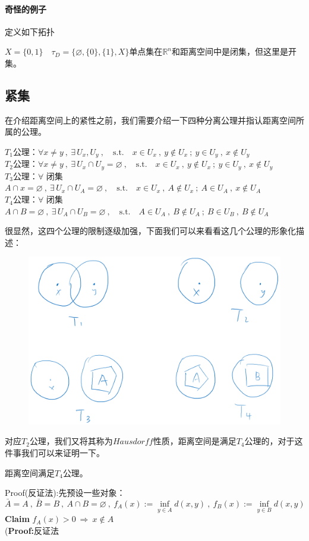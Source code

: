 \paragraph*{奇怪的例子} 定义如下拓扑

$X=\{0,1\} \quad \tau_D=\{\varnothing,\{0\},\{1\},X\}$单点集在$\mathbb{R}^n$和距离空间中是闭集，但这里是开集。

\subsection{紧集}
在介绍距离空间上的紧性之前，我们需要介绍一下四种分离公理并指认距离空间所属的公理。
\begin{proposition}[分离公理]
    $T_1$公理：$\forall x \neq y \ , \ \exists \, U_x,U_y \ , \quad \text{s.t.} \quad x \in U_x \ , \ y \notin U_x \ ; \ y \in U_y \ , \ x \notin U_y$\\
    $T_2$公理：$\forall x \neq y \ , \ \exists \, U_x \cap U_y=\varnothing \ , \quad \text{s.t.} \quad x \in U_x \ , \ y \notin U_x \ ; \ y \in U_y \ , \ x \notin U_y$\\
    $T_3$公理：$\forall$ 闭集$A \cap x=\varnothing \ , \ \exists \, U_x \cap U_A=\varnothing \ , \quad \text{s.t.} \quad x \in U_x \ , \ A \notin U_x \ ; \ A \in U_A \ , \ x \notin U_A$\\
    $T_4$公理：$\forall$ 闭集$A \cap B=\varnothing \ , \ \exists \, U_A \cap U_B=\varnothing \ , \quad \text{s.t.} \quad A \in U_A \ , \ B \notin U_A \ ; \ B \in U_B \ , \ B \notin U_A$
\end{proposition}
很显然，这四个公理的限制逐级加强，下面我们可以来看看这几个公理的形象化描述：
\begin{figure}[htbp]
    \center
    \includegraphics[scale=0.4]{./fig/2.2.2.png}
\end{figure}
对应$T_2$公理，我们又将其称为$Hausdorff$性质，距离空间是满足$T_4$公理的，对于这件事我们可以来证明一下。
\begin{theorem}
    距离空间满足$T_4$公理。
\end{theorem}
Proof(反证法):先预设一些对象：
\[\bar{A}=A \ , \ \bar{B}=B \ , \ A \cap B=\varnothing \ , \ f_A(x):=\mathop {\text{inf}}\limits_{y \in A}d(x,y) \ , \ f_B(x):=\mathop {\text{inf}}\limits_{y \in B}d(x,y)\]
\textbf{Claim} \quad $f_A(x)>0 \ \Rightarrow \ x \notin A$\\
(\textbf{Proof:}反证法

